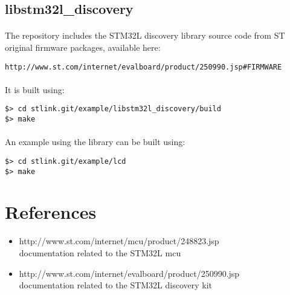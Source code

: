 \documentclass[a4paper, 11pt]{article}
\begin{document}
\subsection{libstm32l\_discovery}
\paragraph{}
The repository includes the STM32L discovery library source code from ST original firmware packages,
available here:\\
\begin{small}
\begin{lstlisting}[frame=tb]
http://www.st.com/internet/evalboard/product/250990.jsp#FIRMWARE
\end{lstlisting}
\end{small}

\paragraph{}
It is built using:\\
\begin{small}
\begin{lstlisting}[frame=tb]
$> cd stlink.git/example/libstm32l_discovery/build
$> make
\end{lstlisting}
\end{small}

\paragraph{}
An example using the library can be built using:\\
\begin{small}
\begin{lstlisting}[frame=tb]
$> cd stlink.git/example/lcd
$> make
\end{lstlisting}
\end{small}

\newpage
\section{References}
\begin{itemize}
\item http://www.st.com/internet/mcu/product/248823.jsp\\
  documentation related to the STM32L mcu
\item http://www.st.com/internet/evalboard/product/250990.jsp\\
  documentation related to the STM32L discovery kit
\end{itemize}
\end{document}
